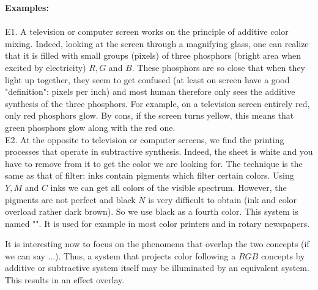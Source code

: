 	\begin{tcolorbox}[colframe=black,colback=white,sharp corners]
	\textbf{{\Large {}}Examples:}\\\\
	E1. A television or computer screen works on the principle of additive color mixing. Indeed, looking at the screen through a magnifying glass, one can realize that it is filled with small groups (pixels) of three phosphors (bright area when excited by electricity) $R, G$ and $B$. These phosphors are so close that when they light up together, they seem to get confused (at least on screen have a good "definition": pixels per inch) and most human therefore only sees the additive synthesis of the three phosphors. For example, on a television screen entirely red, only red phosphors glow. By cons, if the screen turns yellow, this means that green phosphors glow along with the red one.\\
	
	E2. At the opposite to television or computer screens, we find the printing processes that operate in subtractive synthesis. Indeed, the sheet is white and you have to remove from it to get the color we are looking for. The technique is the same as that of filter: inks contain pigments which filter certain colors. Using $Y, M$ and $C$ inks we can get all colors of the visible spectrum. However, the pigments are not perfect and black $N$ is very difficult to obtain (ink and color overload rather dark brown). So we use black as a fourth color. This system is named "". It is used for example in most color printers and in rotary newspapers.
	\end{tcolorbox}
	It is interesting now to focus on the phenomena that overlap the two concepts (if we can say ...). Thus, a system that projects color following a $RGB$ concepts by additive or subtractive system itself may be illuminated by an equivalent system. This results in an effect overlay.
	
